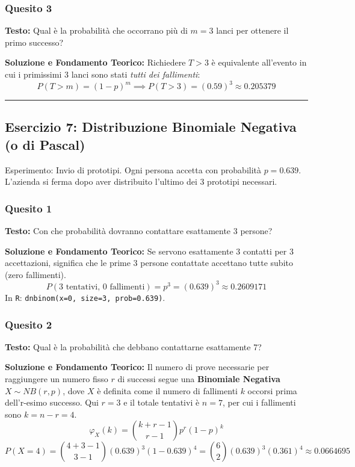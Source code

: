 \documentclass[12pt, a4paper]{article}
\begin{document}
\subsubsection*{Quesito 3}
\textbf{Testo:} Qual è la probabilità che occorrano più di $m=3$ lanci per ottenere il primo successo?

\textbf{Soluzione e Fondamento Teorico:} 
Richiedere $T > 3$ è equivalente all'evento in cui i primissimi 3 lanci sono stati \textit{tutti dei fallimenti}:
$$ P(T > m) = (1-p)^m \implies P(T > 3) = (0.59)^3 \approx 0.205379 $$

\vspace{0.5cm}\hrule\vspace{0.5cm}

\subsection*{Esercizio 7: Distribuzione Binomiale Negativa (o di Pascal)}
Esperimento: Invio di prototipi. Ogni persona accetta con probabilità $p = 0.639$. L'azienda si ferma dopo aver distribuito l'ultimo dei 3 prototipi necessari.

\subsubsection*{Quesito 1}
\textbf{Testo:} Con che probabilità dovranno contattare esattamente 3 persone?

\textbf{Soluzione e Fondamento Teorico:} 
Se servono esattamente 3 contatti per 3 accettazioni, significa che le prime 3 persone contattate accettano tutte subito (zero fallimenti).
$$ P(\text{3 tentativi, 0 fallimenti}) = p^3 = (0.639)^3 \approx 0.2609171 $$
In \texttt{R}: \texttt{dnbinom(x=0, size=3, prob=0.639)}.

\subsubsection*{Quesito 2}
\textbf{Testo:} Qual è la probabilità che debbano contattarne esattamente 7?

\textbf{Soluzione e Fondamento Teorico:} 
Il numero di prove necessarie per raggiungere un numero fisso $r$ di successi segue una \textbf{Binomiale Negativa} $X \sim NB(r, p)$, dove $X$ è definita come il numero di fallimenti $k$ occorsi prima dell'r-esimo successo.
Qui $r = 3$ e il totale tentativi è $n = 7$, per cui i fallimenti sono $k = n - r = 4$.
$$ \varphi_X(k) = \binom{k+r-1}{r-1} p^r (1-p)^k $$
$$ P(X=4) = \binom{4+3-1}{3-1} (0.639)^3 (1 - 0.639)^4 = \binom{6}{2} (0.639)^3 (0.361)^4 \approx 0.0664695 $$
\end{document}
